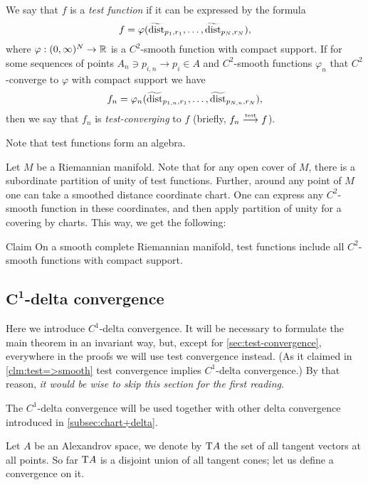 We say that $f$ is a \emph{test function} if it can be expressed by the formula
$$f=\varphi( \widetilde{\operatorname{\rm dist}}_{p_1,r_1}, \dots,   \widetilde{\operatorname{\rm dist}}_{p_N,r_N}),$$
where $\varphi:(0,\infty)^N\to\mathbb{R}$ is a $C^2$-smooth function with compact support.
If for some sequences of points $A_n\ni p_{i,n}\to p_i\in A$ and $C^2$-smooth functions $\varphi_n$ that $C^2$-converge to $\varphi$ with compact support we have
$$f_n=\varphi_n( \widetilde{\operatorname{\rm dist}}_{p_{1,n},r_1},\dots,   \widetilde{\operatorname{\rm dist}}_{p_{N,n},r_N}),$$
then we say that $f_n$ is \emph{test-converging} to $f$ (briefly, $f_n\zz\testto f$).

Note that test functions form an algebra.

Let $M$ be a Riemannian manifold.
Note that for any open cover of $M$, there is a subordinate partition of unity of test functions.
Further, around any point of $M$ one can take a smoothed distance 
coordinate chart.
One can express any $C^2$-smooth function in these 
coordinates, and then apply partition of unity for a covering by charts.
This way, we get the following:

\begin{thm}{Claim}
On a smooth complete Riemannian manifold, test functions
include all $C^2$-smooth functions with compact support.
\end{thm}


\subsection[\texorpdfstring{$C^1$-delta convergence}{C¹-delta convergence}]%
{$\bm{C^1}$-delta convergence}\label{sec:concept}

Here we introduce $C^1$-delta convergence.
It will be necessary to formulate the main theorem in an invariant way, but, except for \ref{sec:test-convergence}, everywhere in the proofs we will use test convergence instead.
(As it claimed in \ref{clm:test=>smooth} test convergence implies $C^1$-delta convergence.)
By that reason, \textit{it would be wise to skip this section for the first reading}.

The $C^1$-delta convergence will be used together with other delta convergence introduced in \ref{subsec:chart+delta}.

Let $A$ be an Alexandrov space, we denote by $\mathrm{T} A$ the set of all tangent vectors at all points.
So far $\mathrm{T} A$ is a disjoint union of all tangent cones;
let us define a convergence on it.


